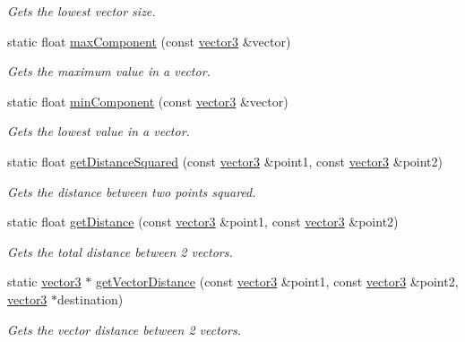 \begin{DoxyCompactItemize}
\begin{DoxyCompactList}\small\item\em Gets the lowest vector size. \end{DoxyCompactList}\item 
static float \hyperlink{classflounder_1_1vector3_a221b510b47bcb1a44214ad2ceea95c01}{max\+Component} (const \hyperlink{classflounder_1_1vector3}{vector3} \&vector)
\begin{DoxyCompactList}\small\item\em Gets the maximum value in a vector. \end{DoxyCompactList}\item 
static float \hyperlink{classflounder_1_1vector3_a720e4ef492b1c2ce847024aa3deed4f8}{min\+Component} (const \hyperlink{classflounder_1_1vector3}{vector3} \&vector)
\begin{DoxyCompactList}\small\item\em Gets the lowest value in a vector. \end{DoxyCompactList}\item 
static float \hyperlink{classflounder_1_1vector3_ac94733c1169517aa8cfba5db58309a3a}{get\+Distance\+Squared} (const \hyperlink{classflounder_1_1vector3}{vector3} \&point1, const \hyperlink{classflounder_1_1vector3}{vector3} \&point2)
\begin{DoxyCompactList}\small\item\em Gets the distance between two points squared. \end{DoxyCompactList}\item 
static float \hyperlink{classflounder_1_1vector3_a84374d3a1d99b2bcdcee65ade03e10c4}{get\+Distance} (const \hyperlink{classflounder_1_1vector3}{vector3} \&point1, const \hyperlink{classflounder_1_1vector3}{vector3} \&point2)
\begin{DoxyCompactList}\small\item\em Gets the total distance between 2 vectors. \end{DoxyCompactList}\item 
static \hyperlink{classflounder_1_1vector3}{vector3} $\ast$ \hyperlink{classflounder_1_1vector3_a44ee778118fc84cf362cbf0a90bf7c53}{get\+Vector\+Distance} (const \hyperlink{classflounder_1_1vector3}{vector3} \&point1, const \hyperlink{classflounder_1_1vector3}{vector3} \&point2, \hyperlink{classflounder_1_1vector3}{vector3} $\ast$destination)
\begin{DoxyCompactList}\small\item\em Gets the vector distance between 2 vectors. \end{DoxyCompactList}\item 

\end{DoxyCompactItemize}

